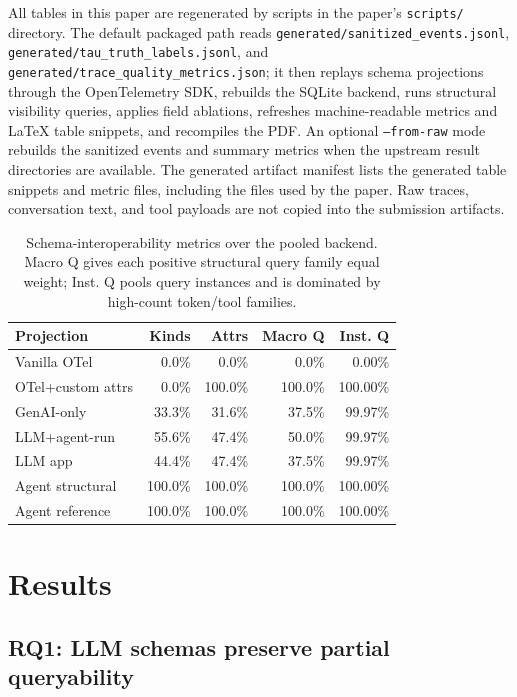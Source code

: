 \documentclass[conference]{IEEEtran}
\begin{document}
All tables in this paper are regenerated by scripts in the paper's
\texttt{scripts/} directory. The default packaged path reads
\texttt{generated/sanitized\_events.jsonl},
\texttt{generated/tau\_truth\_labels.jsonl}, and
\texttt{generated/trace\_quality\_metrics.json}; it then replays schema
projections through the OpenTelemetry SDK, rebuilds the SQLite backend,
runs structural visibility queries, applies field ablations, refreshes
machine-readable metrics and LaTeX table snippets, and recompiles the
PDF. An optional \texttt{--from-raw} mode rebuilds the sanitized events
and summary metrics when the upstream result directories are available.
The generated artifact manifest lists the generated table snippets and
metric files, including the files used by the paper. Raw traces,
conversation text, and tool payloads are not copied into the submission
artifacts.

\begin{table}[t]
\centering
\scriptsize
\caption{Schema-interoperability metrics over the pooled backend. Macro
Q gives each positive structural query family equal weight; Inst. Q
pools query instances and is dominated by high-count token/tool
families.}
\label{tab:interop}
\begin{tabular}{@{}lrrrr@{}}
\toprule
Projection & Kinds & Attrs & Macro Q & Inst. Q \\
\midrule
Vanilla OTel & 0.0\% & 0.0\% & 0.0\% & 0.00\% \\
OTel+custom attrs & 0.0\% & 100.0\% & 100.0\% & 100.00\% \\
GenAI-only & 33.3\% & 31.6\% & 37.5\% & 99.97\% \\
LLM+agent-run & 55.6\% & 47.4\% & 50.0\% & 99.97\% \\
LLM app & 44.4\% & 47.4\% & 37.5\% & 99.97\% \\
Agent structural & 100.0\% & 100.0\% & 100.0\% & 100.00\% \\
Agent reference & 100.0\% & 100.0\% & 100.0\% & 100.00\% \\
\bottomrule
\end{tabular}
\end{table}

\section{Results}
\label{sec:results}

\subsection{\textbf{RQ1}: LLM schemas preserve partial queryability}
\end{document}
